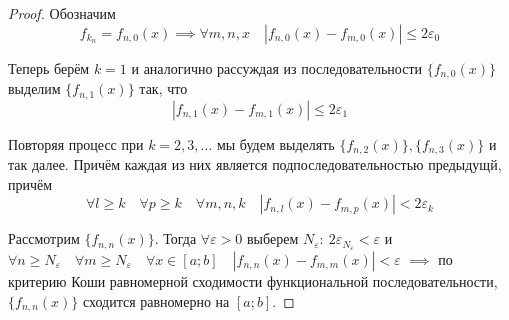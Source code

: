 \begin{proof}
    Обозначим
    \[ 
        f_{k_n} = f_{n,0}(x) \implies 
        \forall m,n,x \quad |f_{n,0}(x) - f_{m,0}(x)| \leq 2\varepsilon_0 
    \]

    Теперь берём $k = 1$ и аналогично рассуждая из последовательности
    $\{ f_{n, 0}(x) \}$ выделим $\{ f_{n,1}(x) \}$ так, что
    \[ |f_{n,1}(x) - f_{m,1}(x)| \leq 2 \varepsilon_1 \]

    Повторяя процесс при $k = 2,3,\dots$ мы будем выделять 
    $\{ f_{n,2}(x) \}, \{ f_{n,3}(x) \}$ и так далее. Причём каждая из них
    является подпоследовательностью предыдущй, причём 
    \[ 
        \forall l \geq k \quad \forall p \geq k \quad \forall m,n,k \quad 
        |f_{n,l}(x) - f_{m,p}(x)| < 2\varepsilon_k
    \]

    Рассмотрим $\{ f_{n,n}(x) \}$. Тогда $\forall \varepsilon > 0$ выберем
    $N_\varepsilon: \: 2\varepsilon_{N_\varepsilon} < \varepsilon$ и
    $\forall n \geq N_\varepsilon \quad \forall m \geq N_\varepsilon \quad
    \forall x \in [a; b] \quad |f_{n,n}(x) - f_{m,m}(x)| < \varepsilon$ 
    $\implies$ по критерию Коши равномерной сходимости функциональной
    последовательности, $\{ f_{n,n}(x) \}$ сходится равномерно на $[a; b]$.
\end{proof}